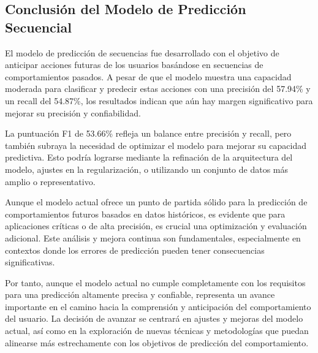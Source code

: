 \subsection{Conclusión del Modelo de Predicción Secuencial}
El modelo de predicción de secuencias fue desarrollado con el objetivo de anticipar acciones futuras de los usuarios basándose en secuencias de comportamientos pasados. A pesar de que el modelo muestra una capacidad moderada para clasificar y predecir estas acciones con una precisión del 57.94\% y un recall del 54.87\%, los resultados indican que aún hay margen significativo para mejorar su precisión y confiabilidad.

La puntuación F1 de 53.66\% refleja un balance entre precisión y recall, pero también subraya la necesidad de optimizar el modelo para mejorar su capacidad predictiva. Esto podría lograrse mediante la refinación de la arquitectura del modelo, ajustes en la regularización, o utilizando un conjunto de datos más amplio o representativo.

Aunque el modelo actual ofrece un punto de partida sólido para la predicción de comportamientos futuros basados en datos históricos, es evidente que para aplicaciones críticas o de alta precisión, es crucial una optimización y evaluación adicional. Este análisis y mejora continua son fundamentales, especialmente en contextos donde los errores de predicción pueden tener consecuencias significativas.

Por tanto, aunque el modelo actual no cumple completamente con los requisitos para una predicción altamente precisa y confiable, representa un avance importante en el camino hacia la comprensión y anticipación del comportamiento del usuario. La decisión de avanzar se centrará en ajustes y mejoras del modelo actual, así como en la exploración de nuevas técnicas y metodologías que puedan alinearse más estrechamente con los objetivos de predicción del comportamiento.